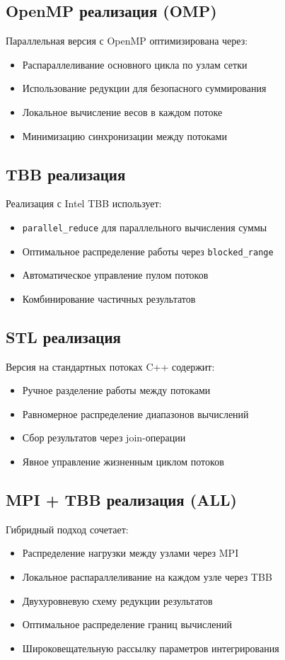 \documentclass[12pt]{article}
\begin{document}
\subsection{OpenMP реализация (OMP)}
Параллельная версия с OpenMP оптимизирована через:
\begin{itemize}
    \item Распараллеливание основного цикла по узлам сетки
    \item Использование редукции для безопасного суммирования
    \item Локальное вычисление весов в каждом потоке
    \item Минимизацию синхронизации между потоками
\end{itemize}

\subsection{TBB реализация}
Реализация с Intel TBB использует:
\begin{itemize}
    \item \texttt{parallel\_reduce} для параллельного вычисления суммы
    \item Оптимальное распределение работы через \texttt{blocked\_range}
    \item Автоматическое управление пулом потоков
    \item Комбинирование частичных результатов
\end{itemize}

\subsection{STL реализация}
Версия на стандартных потоках C++ содержит:
\begin{itemize}
    \item Ручное разделение работы между потоками
    \item Равномерное распределение диапазонов вычислений
    \item Сбор результатов через join-операции
    \item Явное управление жизненным циклом потоков
\end{itemize}

\subsection{MPI + TBB реализация (ALL)}
Гибридный подход сочетает:
\begin{itemize}
    \item Распределение нагрузки между узлами через MPI
    \item Локальное распараллеливание на каждом узле через TBB
    \item Двухуровневую схему редукции результатов
    \item Оптимальное распределение границ вычислений
    \item Широковещательную рассылку параметров интегрирования
\end{itemize}
\end{document}
